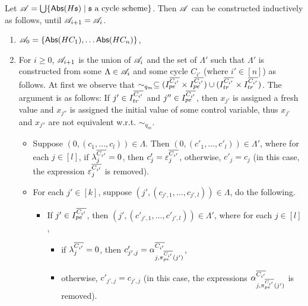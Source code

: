 Let $\mathscr{A}=\bigcup \{\mathsf{Abs}(H{\mathfrak{s} }) \mid {\mathfrak{s} } \mbox{ a cycle scheme}\}$. Then $\mathscr{A}$ can be constructed inductively as follows, until $\mathscr{A}_{i+1}= \mathscr{A}_i$. 
\begin{enumerate}
\item $\mathscr{A}_0 = \{\mathsf{Abs}(HC_1), \ldots \mathsf{Abs}(HC_n)\}$,

\item For $i \ge 0$, $\mathscr{A}_{i+1}$ is the union of $\mathscr{A}_i$ and the set of $\Lambda'$ such that $\Lambda'$ is constructed from some $\Lambda \in \mathscr{A}_i$ and some cycle $C_{i'}$ (where $ i' \in [n]$) as follows. At first we observe that $\sim_{q_m} \subseteq (I^{\overline{C_{i'}}}_{pe} \times I^{\overline{C_{i'}}}_{pe}) \cup (I^{\overline{C_{i'}}}_{tr} \times I^{\overline{C_{i'}}}_{tr})$. The argument is as follows: If $j' \in I^{\overline{C_{i'}}}_{tr}$ and $j'' \in I^{\overline{C_{i'}}}_{pe}$, then $x_{j'}$ is assigned a fresh value and $x_{j''}$ is assigned the initial value of some control variable, thus $x_{j'}$ and $x_{j''}$ are not equivalent w.r.t. $\sim_{q_m}$.
%
\begin{itemize}
\item Suppose $(0, (c_1, \dots, c_l)) \in \Lambda$. Then $(0, (c'_1, \dots, c'_l)) \in \Lambda'$, where for each $j \in [l]$, if $\lambda^{\overline{C_{i'}}}_j = 0$, then $c'_j = \varepsilon^{\overline{C_{i'}}}_{j}$, otherwise, $c'_j = c_j$ (in this case, the expression $\varepsilon^{\overline{C_{i'}}}_{j}$ is removed).  
%
\item For each $j' \in [k]$, suppose $(j', (c_{j',1}, \dots, c_{j',l})) \in \Lambda$, do the following. 
\begin{itemize}
\item If $j' \in I^{\overline{C_{i'}}}_{pe}$, then $(j', (c'_{j', 1}, \dots, c'_{j', l})) \in \Lambda'$,  where for each $j \in [l]$, 
\begin{itemize}
\item if $\lambda^{\overline{C_{i'}}}_j = 0$, then $c'_{j', j}=  \alpha^{\overline{C_{i'}}}_{j, \pi^{\overline{C_{i'}}}_{pe}(j')}$, 
%
\item otherwise, $c'_{j', j} = c_{j',j} $ (in this case, the expressions $\alpha^{\overline{C_{i'}}}_{j, \pi^{\overline{C_{i'}}}_{pe}(j')}$ is removed).

\end{itemize}
\end{itemize}
\end{itemize}
\end{enumerate}
